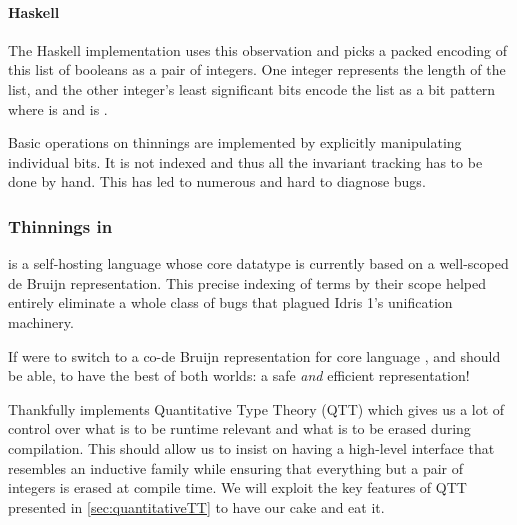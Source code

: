 \paragraph{Haskell}
The Haskell implementation uses this observation and picks a packed encoding
of this list of booleans as a pair of integers.
%
One integer represents the length  of the list, and the other
integer's  least significant bits encode the list as a bit pattern
where  is  and  is .

Basic operations on thinnings are implemented by explicitly manipulating individual bits.
%
It is not indexed and thus all the invariant tracking has to be done by hand.
This has led to numerous and hard to diagnose bugs.

\subsubsection{Thinnings in \idris}

\idris{} is a self-hosting language whose core datatype is currently based on
a well-scoped de Bruijn representation.
%
This precise indexing of terms by their scope helped entirely eliminate a whole
class of bugs that plagued Idris 1's unification machinery.

If \iftoggle{BLIND}{\idris{}}{we} were to switch to a co-de Bruijn
representation for \iftoggle{BLIND}{the}{our} core language
\iftoggle{BLIND}{the core developers would want}{we would want},
and should be able, to have the best of both worlds:
a safe \emph{and} efficient representation!

Thankfully \idris{} implements Quantitative Type Theory (QTT) which gives us a
lot of control over what is to be runtime relevant and what is to be erased
during compilation.
%
This should allow us to insist on having a high-level interface that resembles
an inductive family while ensuring that everything but a pair of integers is erased
at compile time.
%
We will exploit the key features of QTT presented in \cref{sec:quantitativeTT}
to have our cake and eat it.
